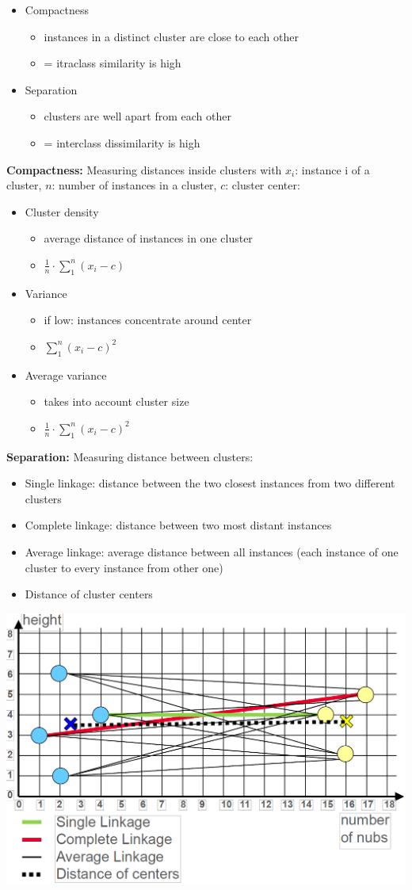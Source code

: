 \begin{breakbox}

\begin{itemize}
	\item Compactness
		\begin{itemize}
			\item instances in a distinct cluster are close to each other
			\item = itraclass similarity is high		
	\end{itemize}				
	\item Separation
		\begin{itemize}
			\item clusters are well apart from each other
			\item = interclass dissimilarity is high
		\end{itemize}
\end{itemize}

\textbf{Compactness:} Measuring distances inside clusters with $x_i$: instance i of a cluster, $n$: number of instances in a cluster, $c$: cluster center:
\begin{itemize}
	\item Cluster density
		\begin{itemize}
			\item average distance of instances in one cluster
			\item $\frac{1}{n} \cdot \sum_{1}^{n}(x_i - c)$ 
		\end{itemize}
	\item Variance
		\begin{itemize}
			\item if low: instances concentrate around center
			\item $\sum_{1}^{n}(x_i - c)^2$
		\end{itemize}
	\item Average variance
		\begin{itemize}
			\item takes into account cluster size
			\item $\frac{1}{n} \cdot \sum_{1}^{n}(x_i - c)^2$ 
		\end{itemize}
\end{itemize}

\textbf{Separation:} Measuring distance between clusters:
\begin{itemize}
	\item Single linkage: distance between the two closest instances from two different clusters
	\item Complete linkage: distance between two most distant instances
	\item Average linkage: average distance between all instances (each instance of one cluster to every instance from other one)
	\item Distance of cluster centers
\end{itemize}

\begin{center}
	\includegraphics[width=.15\textwidth]{slides_images/cluster_distance_measurements_separation}
\end{center}

\end{breakbox}

